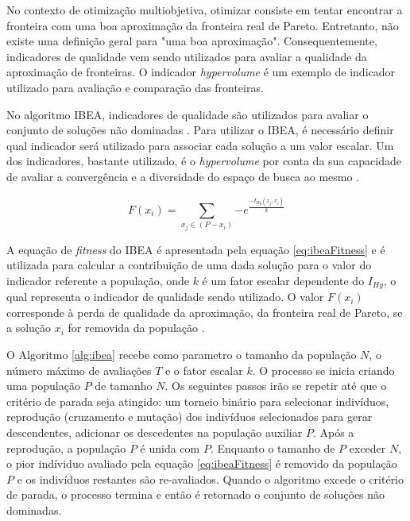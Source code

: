 No contexto de otimização multiobjetiva, otimizar consiste em tentar encontrar a fronteira com uma boa aproximação da fronteira real de Pareto. 
Entretanto, não existe uma definição geral para "uma boa aproximação". Consequentemente, indicadores de qualidade vem sendo utilizados
para avaliar a qualidade da aproximação de fronteiras. O indicador \textit{hypervolume} é um exemplo de indicador utilizado para avaliação e comparação 
das fronteiras.

No algoritmo IBEA, indicadores de qualidade são	utilizados para avaliar o conjunto de soluções não dominadas \cite{figueiredo2013algoritmo}.
Para utilizar o IBEA, é necessário definir qual indicador será utilizado para associar cada solução a um valor escalar. Um dos indicadores, bastante utilizado, é o \textit{hypervolume} por conta da sua capacidade de avaliar a convergência e a diversidade do espaço de busca ao mesmo \cite{ishibuchi2008evolutionary}.

\begin{equation} \label{eq:ibeaFitness}
F(x_i) = \sum_{x_j \in (P-x_i)} {-e^\frac{-I_{Hy}(x_j,x_i)}{k}}
\end{equation}

A equação de \textit{fitness} do IBEA é apresentada pela equação \ref{eq:ibeaFitness} e é utilizada para calcular a contribuição de uma dada solução
para o valor do indicador referente a população, onde $k$ é um fator escalar dependente do $I_{Hy}$, o qual representa o indicador de qualidade sendo utilizado. O valor $F(x_i)$ corresponde à perda de qualidade da aproximação, da fronteira real de Pareto, se a solução $x_i$ for removida da população \cite{figueiredo2013algoritmo}.


O Algoritmo \ref{alg:ibea} recebe como parametro o tamanho da população $N$, o número máximo de avaliações $T$ e o fator escalar $k$. O processo se inicia
criando uma população $P$ de tamanho $N$. Os seguintes passos irão se repetir até que o critério de parada seja atingido: um torneio binário 
para selecionar indivíduos, reprodução (cruzamento e mutação) dos indivíduos selecionados para gerar descendentes, adicionar os descedentes na população
auxiliar $\overline P$. Após a reprodução, a população $\overline P$ é unida com $P$. Enquanto o tamanho de $P$ exceder $N$, o pior indíviduo avaliado
pela equação \ref{eq:ibeaFitness} é removido da população $P$ e os indivíduos restantes são re-avaliados. Quando o algoritmo excede o critério de parada, o processo termina e então é retornado o conjunto de soluções não dominadas.


